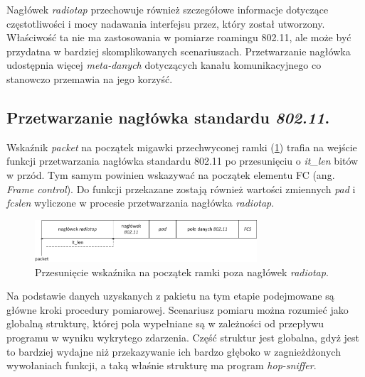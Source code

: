 Nagłówek \emph{radiotap} przechowuje również szczegółowe informacje dotyczące częstotliwości i mocy nadawania interfejsu przez, który został utworzony. Właściwość ta nie ma zastosowania w pomiarze roamingu 802.11, ale może być przydatna w bardziej skomplikowanych scenariuszach. Przetwarzanie nagłówka udostępnia więcej \emph{meta-danych} dotyczących kanału komunikacyjnego co stanowczo przemawia na jego korzyść. 

\subsection{Przetwarzanie nagłówka standardu \emph{802.11}.}

Wskaźnik \emph{packet} na początek migawki przechwyconej ramki (\ref{RadiotapWifi}) trafia na wejście funkcji przetwarzania nagłówka standardu 802.11 po przesunięciu o \emph{it\_len} bitów w przód. Tym samym powinien wskazywać na początek elementu FC (ang. \emph{Frame control}). Do funkcji przekazane zostają również wartości zmiennych \emph{pad} i \emph{fcslen} wyliczone w procesie przetwarzania nagłówka \emph{radiotap}. 

\begin{figure}[htb]
\begin{center}
\includegraphics[width=312px]{img/RadiotapWifi}
\caption{Przesunięcie wskaźnika na początek ramki poza nagłówek \emph{radiotap}.}
\label{RadiotapWifi}
\end{center}
\end{figure}

Na podstawie danych uzyskanych z pakietu na tym etapie podejmowane są główne kroki procedury pomiarowej. Scenariusz pomiaru można rozumieć jako globalną strukturę, której pola wypełniane są w zależności od przepływu programu w wyniku wykrytego zdarzenia. Część struktur jest globalna, gdyż jest to bardziej wydajne niż przekazywanie ich bardzo głęboko w zagnieżdżonych wywołaniach funkcji, a taką właśnie strukturę ma program \emph{hop-sniffer}. 

